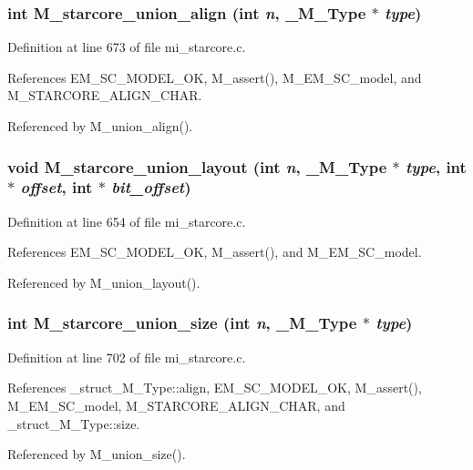 \subsubsection{\setlength{\rightskip}{0pt plus 5cm}int M\_\-starcore\_\-union\_\-align (int {\em n}, \bf{\_\-M\_\-Type} $\ast$ {\em type})}\label{m__starcore_8h_e2047a33ad8aa48db4d0d57ede101940}




Definition at line 673 of file mi\_\-starcore.c.

References EM\_\-SC\_\-MODEL\_\-OK, M\_\-assert(), M\_\-EM\_\-SC\_\-model, and M\_\-STARCORE\_\-ALIGN\_\-CHAR.

Referenced by M\_\-union\_\-align().
\subsubsection{\setlength{\rightskip}{0pt plus 5cm}void M\_\-starcore\_\-union\_\-layout (int {\em n}, \bf{\_\-M\_\-Type} $\ast$ {\em type}, int $\ast$ {\em offset}, int $\ast$ {\em bit\_\-offset})}\label{m__starcore_8h_970da6d97e5dd5f4878097e46cf6e606}




Definition at line 654 of file mi\_\-starcore.c.

References EM\_\-SC\_\-MODEL\_\-OK, M\_\-assert(), and M\_\-EM\_\-SC\_\-model.

Referenced by M\_\-union\_\-layout().
\subsubsection{\setlength{\rightskip}{0pt plus 5cm}int M\_\-starcore\_\-union\_\-size (int {\em n}, \bf{\_\-M\_\-Type} $\ast$ {\em type})}\label{m__starcore_8h_c47599db6f476890cb500ff2deaddd89}




Definition at line 702 of file mi\_\-starcore.c.

References \_\-struct\_\-M\_\-Type::align, EM\_\-SC\_\-MODEL\_\-OK, M\_\-assert(), M\_\-EM\_\-SC\_\-model, M\_\-STARCORE\_\-ALIGN\_\-CHAR, and \_\-struct\_\-M\_\-Type::size.

Referenced by M\_\-union\_\-size().
